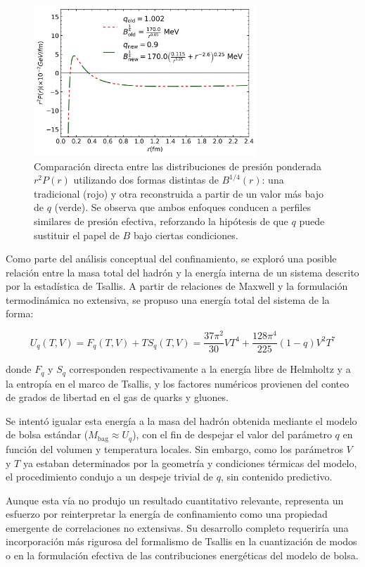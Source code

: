 \begin{figure}[H]
    \centering
    \includegraphics[width=0.75\textwidth]{./Images/Comparacion_B_old_new_combined.png}
    \caption[Comparaci\'on entre presiones con \( q = 1.002 \) y \( q = 0.9 \)]{Comparaci\'on directa entre las distribuciones de presi\'on ponderada \( r^2 P(r) \) utilizando dos formas distintas de \( B^{1/4}(r) \): una tradicional (rojo) y otra reconstruida a partir de un valor m\'as bajo de \( q \) (verde). Se observa que ambos enfoques conducen a perfiles similares de presi\'on efectiva, reforzando la hip\'otesis de que \( q \) puede sustituir el papel de \( B \) bajo ciertas condiciones.}
    \label{fig:B_reconstructed_combined}
\end{figure}
\begin{remark}
    Como parte del análisis conceptual del confinamiento, se exploró una posible relación entre la masa total del hadrón\cite{Johnson1975} y la energía interna de un sistema descrito por la estadística de Tsallis. A partir de relaciones de Maxwell y la formulación termodinámica no extensiva, se propuso una energía total del sistema de la forma:
    
    \[
    U_q(T, V) = F_q(T, V) + T S_q(T, V) = \frac{37 \pi^2}{30} V T^4 + \frac{128 \pi^4}{225} (1 - q) V^2 T^7
    \]
    
    donde \( F_q \) y \( S_q \) corresponden respectivamente a la energía libre de Helmholtz y a la entropía en el marco de Tsallis, y los factores numéricos provienen del conteo de grados de libertad en el gas de quarks y gluones.
    
    Se intentó igualar esta energía a la masa del hadrón obtenida mediante el modelo de bolsa estándar (\( M_{\text{bag}} \approx U_q \)), con el fin de despejar el valor del parámetro \( q \) en función del volumen y temperatura locales. Sin embargo, como los parámetros \( V \) y \( T \) ya estaban determinados por la geometría y condiciones térmicas del modelo, el procedimiento condujo a un despeje trivial de \( q \), sin contenido predictivo.
    
    Aunque esta vía no produjo un resultado cuantitativo relevante, representa un esfuerzo por reinterpretar la energía de confinamiento como una propiedad emergente de correlaciones no extensivas. Su desarrollo completo requeriría una incorporación más rigurosa del formalismo de Tsallis en la cuantización de modos o en la formulación efectiva de las contribuciones energéticas del modelo de bolsa.
\end{remark}

